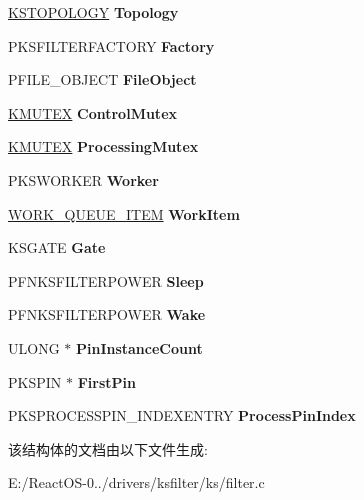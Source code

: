 \begin{DoxyCompactItemize}
\hyperlink{struct_k_s_t_o_p_o_l_o_g_y}{K\+S\+T\+O\+P\+O\+L\+O\+GY} {\bfseries Topology}
\item 
\mbox{\label{struct_i_ks_filter_impl_a09c5cc7c3d31ec56d433bac921888983}} 
P\+K\+S\+F\+I\+L\+T\+E\+R\+F\+A\+C\+T\+O\+RY {\bfseries Factory}
\item 
\mbox{\label{struct_i_ks_filter_impl_a4065a58967bf6dab33129e3e461d594d}} 
P\+F\+I\+L\+E\+\_\+\+O\+B\+J\+E\+CT {\bfseries File\+Object}
\item 
\mbox{\label{struct_i_ks_filter_impl_a6f98292514b62048786e73b4620f0216}} 
\hyperlink{struct___k_m_u_t_a_n_t}{K\+M\+U\+T\+EX} {\bfseries Control\+Mutex}
\item 
\mbox{\label{struct_i_ks_filter_impl_a1d6de8d292198b4bd7be13b8a144c056}} 
\hyperlink{struct___k_m_u_t_a_n_t}{K\+M\+U\+T\+EX} {\bfseries Processing\+Mutex}
\item 
\mbox{\label{struct_i_ks_filter_impl_ad0e72b8286f6e97d6067bcc71882b88d}} 
P\+K\+S\+W\+O\+R\+K\+ER {\bfseries Worker}
\item 
\mbox{\label{struct_i_ks_filter_impl_a3d5aff60d8775dcb487ca1e049f70b50}} 
\hyperlink{struct___w_o_r_k___q_u_e_u_e___i_t_e_m}{W\+O\+R\+K\+\_\+\+Q\+U\+E\+U\+E\+\_\+\+I\+T\+EM} {\bfseries Work\+Item}
\item 
\mbox{\label{struct_i_ks_filter_impl_a9394790002850c5442ab73d7b222928e}} 
K\+S\+G\+A\+TE {\bfseries Gate}
\item 
\mbox{\label{struct_i_ks_filter_impl_a3af7cecc3f14d50b8b471e367a2ae167}} 
P\+F\+N\+K\+S\+F\+I\+L\+T\+E\+R\+P\+O\+W\+ER {\bfseries Sleep}
\item 
\mbox{\label{struct_i_ks_filter_impl_a12efb9e6accc4e865f8106afa2a63238}} 
P\+F\+N\+K\+S\+F\+I\+L\+T\+E\+R\+P\+O\+W\+ER {\bfseries Wake}
\item 
\mbox{\label{struct_i_ks_filter_impl_a55fcfcb25ec43cb1c6f21a65a549aba2}} 
U\+L\+O\+NG $\ast$ {\bfseries Pin\+Instance\+Count}
\item 
\mbox{\label{struct_i_ks_filter_impl_a4181045df3f6931e8ab53994f5d6a033}} 
P\+K\+S\+P\+IN $\ast$ {\bfseries First\+Pin}
\item 
\mbox{\label{struct_i_ks_filter_impl_a7653a9430407cfcbe601ff006f0e6a60}} 
P\+K\+S\+P\+R\+O\+C\+E\+S\+S\+P\+I\+N\+\_\+\+I\+N\+D\+E\+X\+E\+N\+T\+RY {\bfseries Process\+Pin\+Index}
\end{DoxyCompactItemize}


该结构体的文档由以下文件生成\+:\begin{DoxyCompactItemize}
\item 
E\+:/\+React\+O\+S-\/0../drivers/ksfilter/ks/filter.\+c\end{DoxyCompactItemize}
